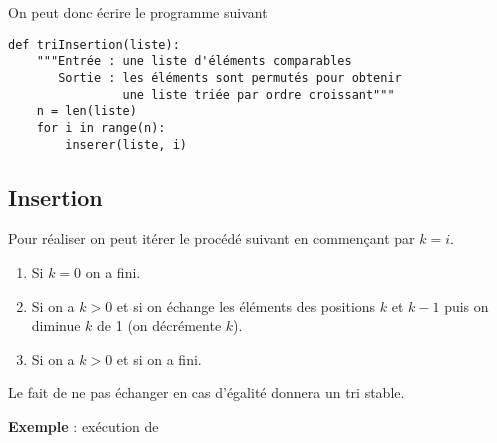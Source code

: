 On peut donc écrire le programme suivant
\begin{lstlisting}
def triInsertion(liste):
    """Entrée : une liste d'éléments comparables 
       Sortie : les éléments sont permutés pour obtenir
                une liste triée par ordre croissant"""
    n = len(liste)
    for i in range(n):
        inserer(liste, i)
\end{lstlisting}
\newpage
\subsection{Insertion}
Pour réaliser  on peut itérer le procédé suivant en commençant par $k=i$.
\begin{enumerate}
\item Si $k=0$ on a fini.
\item Si on a $k> 0$ et si  on échange les éléments des positions $k$ et $k-1$ puis on diminue $k$ de 1 (on décrémente $k$).
\item Si on a $k> 0$ et si  on a fini.
\end{enumerate}

Le fait de ne pas échanger en cas d'égalité donnera un tri stable.

{\bf Exemple} : exécution de  

